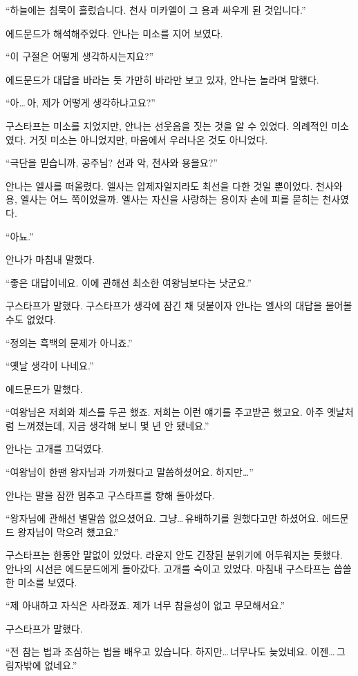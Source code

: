 ``하늘에는 침묵이 흘렀습니다. 천사 미카엘이 그 용과 싸우게 된 것입니다.''

에드문드가 해석해주었다. 안나는 미소를 지어 보였다.

``이 구절은 어떻게 생각하시는지요?''

에드문드가 대답을 바라는 듯 가만히 바라만 보고 있자, 안나는 놀라며 말했다.

``아\ldots\,아, 제가 어떻게 생각하냐고요?''

구스타프는 미소를 지었지만, 안나는 선웃음을 짓는 것을 알 수 있었다. 의례적인 미소였다. 거짓 미소는 아니었지만, 마음에서 우러나온 것도 아니었다.

``극단을 믿습니까, 공주님? 선과 악, 천사와 용을요?''

안나는 엘사를 떠올렸다. 엘사는 압제자일지라도 최선을 다한 것일 뿐이었다. 천사와 용, 엘사는 어느 쪽이었을까. 엘사는 자신을 사랑하는 용이자 손에 피를 묻히는 천사였다.

``아뇨.''

안나가 마침내 말했다.

``좋은 대답이네요. 이에 관해선 최소한 여왕님보다는 낫군요.''

구스타프가 말했다. 구스타프가 생각에 잠긴 채 덧붙이자 안나는 엘사의 대답을 물어볼 수도 없었다.

``정의는 흑백의 문제가 아니죠.''

``옛날 생각이 나네요.''

에드문드가 말했다.

``여왕님은 저희와 체스를 두곤 했죠. 저희는 이런 얘기를 주고받곤 했고요. 아주 옛날처럼 느껴졌는데, 지금 생각해 보니 몇 년 안 됐네요.''

안나는 고개를 끄덕였다.

``여왕님이 한땐 왕자님과 가까웠다고 말씀하셨어요. 하지만\ldots''

안나는 말을 잠깐 멈추고 구스타프를 향해 돌아섰다.

``왕자님에 관해선 별말씀 없으셨어요. 그냥\ldots\,유배하기를 원했다고만 하셨어요. 에드문드 왕자님이 막으려 했고요.''

구스타프는 한동안 말없이 있었다. 라운지 안도 긴장된 분위기에 어두워지는 듯했다. 안나의 시선은 에드문드에게 돌아갔다. 고개를 숙이고 있었다. 마침내 구스타프는 씁쓸한 미소를 보였다.

``제 아내하고 자식은 사라졌죠. 제가 너무 참을성이 없고 무모해서요.''

구스타프가 말했다.

``전 참는 법과 조심하는 법을 배우고 있습니다. 하지만\ldots\,너무나도 늦었네요. 이젠\ldots\,그림자밖에 없네요.''


